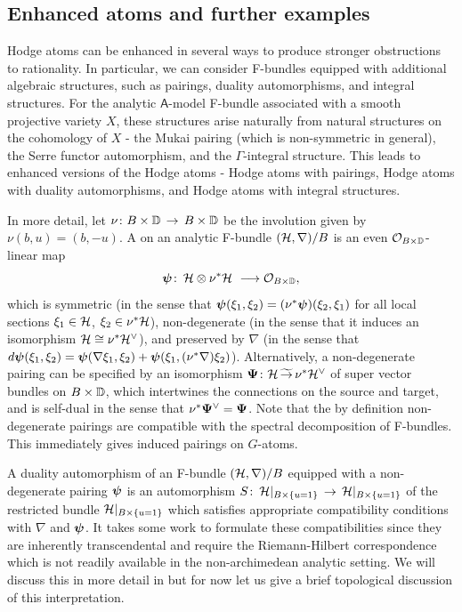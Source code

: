 \documentclass[twoside,leqno]{article}
\numberwithin{equation}{section}
\theoremstyle{plain}
\theoremstyle{definition}
\begin{document}
\subsection{Enhanced atoms and further examples} \label{ssec:enhanced}

Hodge atoms can be enhanced in several ways to produce stronger obstructions to rationality.
In particular, we can consider F-bundles equipped with additional algebraic structures, such as pairings, duality automorphisms, and integral structures. For the analytic $\mathsf{A}$-model F-bundle associated with a smooth projective variety $X$,  these structures arise naturally from natural  structures on  the cohomology of $X$ -  the Mukai pairing (which is non-symmetric in general), the Serre functor automorphism, and the $\Gamma$-integral structure.  
This leads to enhanced versions of the Hodge atoms -  Hodge atoms with  pairings, Hodge atoms with duality automorphisms, and Hodge atoms with integral structures. 

\medskip

In more detail, let $\nu \colon B\times \mathbb D \, \to \, B\times \mathbb D$ be the involution given by $\nu(b,u) = (b,-u)$. 
A  on an analytic F-bundle $(\mathcal H,\nabla)/B$ is an even  $\mathcal O_{B\times \mathbb D}$-linear map
\[
\bpsi \colon \, \cH\otimes \nu^{*}\cH \ \longrightarrow \cO_{B\times \bbD}, 
\]
which is symmetric (in the sense that $\boldsymbol{\psi}(\xi_{1},\xi_{2}) = (\nu^{*}\boldsymbol{\psi})(\xi_{2}, \xi_{1})$ for all local sections $\xi_{1} \in \mathcal H$, $\xi_{2} \in \nu^{*}\mathcal H$), non-degenerate (in the sense that it induces an isomorphism 
$\mathcal H \cong \nu^{*}\mathcal H^{\vee}$), and preserved by  $\nabla$ (in the sense that 
$d\boldsymbol{\psi}(\xi_{1},\xi_{2}) = \boldsymbol{\psi}(\nabla\xi_{1},\xi_{2}) + \boldsymbol{\psi}(\xi_{1},(\nu^{*}\nabla)\xi_{2})$). Alternatively, a non-degenerate pairing can be specified by an isomorphism $\boldsymbol{\Psi} \colon \mathcal H \, \widetilde{\to} \, \nu^{*}\mathcal H^{\vee}$ of super vector bundles on $B\times \mathbb D$, which intertwines the connections on the source and target, and is self-dual in the sense that $\nu^{*}\boldsymbol{\Psi}^{\vee} = \boldsymbol{\Psi}$.
Note that the by definition non-degenerate pairings are compatible with the spectral decomposition of F-bundles. This immediately gives induced pairings on $G$-atoms.

A duality automorphism of an F-bundle $(\mathcal H,\nabla)/B$ equipped with a non-degenerate pairing $\boldsymbol{\psi}$  is an automorphism $S \colon \, \mathcal H|_{B\times \{u = 1\}} \, \to \, \mathcal H|_{B\times \{u = 1\}}$ of the restricted bundle $\mathcal H|_{B\times \{u = 1\}}$ which satisfies appropriate compatibility conditions with $\nabla$ and $\boldsymbol{\psi}$. It takes some work to formulate these compatibilities since they are inherently transcendental and require the Riemann-Hilbert correspondence which is not readily available in the non-archimedean analytic setting.  
We will discuss this in more detail in \cite{KKPY-Gamma} but for now let us give a brief topological discussion of this interpretation. 
\end{document}
